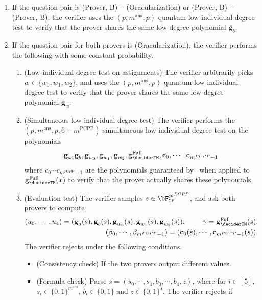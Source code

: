 \begin{enumerate}
	\item If the question pair is (Prover, B) \textbf{--} (Oracularization) or  (Prover, B) \textbf{--} (Prover, B), the verifier uses the $(p, m^{\text{ans}}, p)$-quantum low-individual degree test to verify that the prover shares the same low degree polynomial $\overline{\textbf{g}}_b$. 
	\item If the question pair for both provers is (Oracularization), the verifier performs the following with some constant probability. 
	\begin{enumerate}
		\item (Low-individual degree test on assignments) The verifier arbitrarily picks $w \in \{w_0, w_1, w_2\}$, and uses the $(p, m^{\text{ans}}, p)$-quantum low-individual degree test to verify that the prover shares the same low degree polynomial $\overline{\textbf{g}}_w$. 
		\item (Simultaneous low-individual degree test) The verifier performs the $(p, m^{\text{ans}}, p, 6 + m^{\text{PCPP}})$-simultaneous low-individual degree test on the polynomials
		\begin{equation*}
			\textbf{g}_a, \textbf{g}_b,\textbf{g}_{w_0}, \textbf{g}_{w_1},\textbf{g}_{w_2}, \textbf{g}_{\deciderTM}^{\text{Full}},  \textbf{c}_0, \cdots,  \textbf{c}_{m^{PCPP} -1}
		\end{equation*} 
		where $c_0 \cdots c_{m^{PCPP} -1}$ are the polynomials guaranteed by~ when applied to $\textbf{g}_{\deciderTM}^{\text{Full}}(x)$ to verify that the prover actually shares these polynomials.  
		\item (Evaluation test) The verifier samples $s \in \bF_{2^p}^{m^{PCPP}}$, and ask both provers to compute
		\begin{align*}
			(u_0, \cdots, u_4) = (\textbf{g}_a(s), \textbf{g}_b(s),\textbf{g}_{w_0}(s), \textbf{g}_{w_1}(s),\textbf{g}_{w_2}(s)), \, \qquad \, \gamma = \textbf{g}_{\deciderTM}^{\text{Full}}(s),  \\
			(\beta_0, \cdots, \beta_{m^{PCPP} -1}) =( \textbf{c}_0(s), \cdots,  \textbf{c}_{m^{PCPP} -1}(s)). 
		\end{align*}
		The verifier rejects under the following conditions.
		\begin{itemize}
			\item (Consistency check)  If the two provers output different values. 
			\item (Formula check)  Parse $s =(s_0, \cdots, s_4, b_0, \cdots, b_4, z)$, where for $i \in [5]$, $s_i \in \{0,1\}^{m^{\text{ans}}}$,  $b_i \in \{0,1\}$ and $z \in \{0,1\}^s$. The verifier rejects if

\end{itemize}
\end{enumerate}
\end{enumerate}
